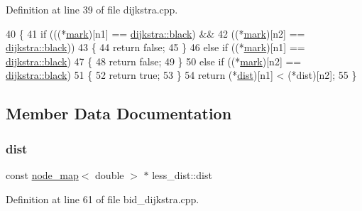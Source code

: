 Definition at line 39 of file dijkstra.\+cpp.


\begin{DoxyCode}
40     \{
41     \textcolor{keywordflow}{if} (((*\mbox{\hyperlink{classless__dist_a7905c2d559b1b629175fc810c643375c}{mark}})[n1] == \mbox{\hyperlink{classdijkstra_a2bdd8d3b57860b5715d01e65664e810fa958572ed471642bb14fce76ae9284bb5}{dijkstra::black}}) &&
42         ((*\mbox{\hyperlink{classless__dist_a7905c2d559b1b629175fc810c643375c}{mark}})[n2] == \mbox{\hyperlink{classdijkstra_a2bdd8d3b57860b5715d01e65664e810fa958572ed471642bb14fce76ae9284bb5}{dijkstra::black}}))
43     \{
44         \textcolor{keywordflow}{return} \textcolor{keyword}{false};
45     \}
46     \textcolor{keywordflow}{else} \textcolor{keywordflow}{if} ((*\mbox{\hyperlink{classless__dist_a7905c2d559b1b629175fc810c643375c}{mark}})[n1] == \mbox{\hyperlink{classdijkstra_a2bdd8d3b57860b5715d01e65664e810fa958572ed471642bb14fce76ae9284bb5}{dijkstra::black}})
47     \{
48         \textcolor{keywordflow}{return} \textcolor{keyword}{false};
49     \}
50     \textcolor{keywordflow}{else} \textcolor{keywordflow}{if} ((*\mbox{\hyperlink{classless__dist_a7905c2d559b1b629175fc810c643375c}{mark}})[n2] == \mbox{\hyperlink{classdijkstra_a2bdd8d3b57860b5715d01e65664e810fa958572ed471642bb14fce76ae9284bb5}{dijkstra::black}})
51     \{
52         \textcolor{keywordflow}{return} \textcolor{keyword}{true};
53     \}
54     \textcolor{keywordflow}{return} (*\mbox{\hyperlink{classless__dist_a5e27ffa3cd5b99bcf5c205fc021ddbb8}{dist}})[n1] < (*dist)[n2];
55     \}
\end{DoxyCode}


\subsection{Member Data Documentation}
\mbox{\label{classless__dist_a5e27ffa3cd5b99bcf5c205fc021ddbb8}} 
\subsubsection{\texorpdfstring{dist}{dist}}
{\footnotesize\ttfamily const \mbox{\hyperlink{classnode__map}{node\+\_\+map}}$<$ double $>$ $\ast$ less\+\_\+dist\+::dist\hspace{0.3cm}{\ttfamily [private]}}



Definition at line 61 of file bid\+\_\+dijkstra.\+cpp.

